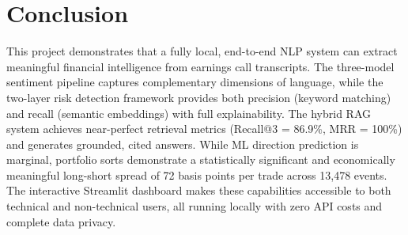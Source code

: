 \documentclass[12pt,a4paper]{article}
\begin{document}
\section{Conclusion}
\label{sec:conclusion}

This project demonstrates that a fully local, end-to-end NLP system can extract meaningful financial intelligence from earnings call transcripts. The three-model sentiment pipeline captures complementary dimensions of language, while the two-layer risk detection framework provides both precision (keyword matching) and recall (semantic embeddings) with full explainability. The hybrid RAG system achieves near-perfect retrieval metrics (Recall@3 = 86.9\%, MRR = 100\%) and generates grounded, cited answers. While ML direction prediction is marginal, portfolio sorts demonstrate a statistically significant and economically meaningful long-short spread of 72 basis points per trade across 13,478 events. The interactive Streamlit dashboard makes these capabilities accessible to both technical and non-technical users, all running locally with zero API costs and complete data privacy.
\end{document}
